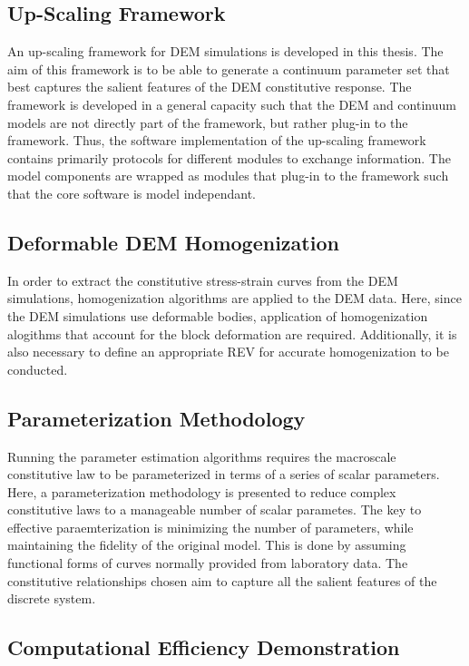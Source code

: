 \subsection*{Up-Scaling Framework}

An up-scaling framework for DEM simulations is developed in this thesis. The aim of this framework is to be able to generate a continuum parameter set that best captures the salient features of the DEM constitutive response. The framework is developed in a general capacity such that the DEM and continuum models are not directly part of the framework, but rather plug-in to the framework. Thus, the software implementation of the up-scaling framework contains primarily protocols for different modules to exchange information. The model components are wrapped as modules that plug-in to the framework such that the core software is model independant. 

\subsection*{Deformable DEM Homogenization}

In order to extract the constitutive stress-strain curves from the DEM simulations, homogenization algorithms are applied to the DEM data. Here, since the DEM simulations use deformable bodies, application of homogenization alogithms that account for the block deformation are required.  Additionally, it is also necessary to define an appropriate REV for accurate homogenization to be conducted.

\subsection*{Parameterization Methodology}

Running the parameter estimation algorithms requires the macroscale constitutive law to be parameterized in terms of a series of scalar parameters. Here, a parameterization methodology is presented to reduce complex constitutive laws to a manageable number of scalar parametes. The key to effective paraemterization is minimizing the number of parameters, while maintaining the fidelity of the original model. This is done by assuming functional forms of curves normally provided from laboratory data. The constitutive relationships chosen aim to capture all the salient features of the discrete system. 

\subsection*{Computational Efficiency Demonstration}


